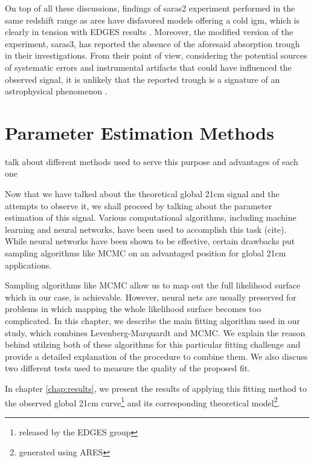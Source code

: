 \documentclass[12pt, TexShade, letterpaper]{report}
\begin{document}
 On top of all these discussions, findings of \gls{saras}2 experiment performed in the same redshift range as \gls{ares} have disfavored models offering a cold \gls{igm}, which is clearly in tension with EDGES results \cite{saras_2_constrains, saras_2_results}. Moreover, the modified version of the experiment, \gls{saras}3, has reported the absence of the aforesaid absorption trough in their investigations. From their point of view, considering the potential sources of systematic errors and instrumental artifacts that could have influenced the observed signal, it is unlikely that the reported trough is a signature of an astrophysical phenomenon \cite{saras_3_results, saras_curse_edges}.\par
\chapter{Parameter Estimation Methods}
\label{chap:method}
talk about different methods used to serve this purpose and advantages of each one\par
Now that we have talked about the theoretical global 21cm signal and the attempts to observe it, we shall proceed by talking about the parameter estimation of this signal. Various computational algorithms, including machine learning and neural networks, have been used to accomplish this task (cite). While neural networks have been shown to be effective, certain drawbacks  put sampling algorithms like MCMC on an advantaged position for global 21cm applications.\par
Sampling algorithms like MCMC allow us to map out the full likelihood surface which in our case, is achievable. However, neural nets are usually preserved for problems in which mapping the whole likelihood surface  becomes too complicated.
In this chapter, we describe the main fitting algorithm used in our study, which combines Levenberg-Marquardt and MCMC. We explain the reason behind utilzing both of these algorithms for this particular fitting challenge and provide a detailed explanation of the procedure to combine them. We also discuss two different tests used to measure the quality of the proposed fit.\par
In chapter \ref{chap:results}, we present the results of applying this fitting method to the observed global 21cm curve\footnote{released by the EDGES group} and its corresponding theoretical model\footnote{generated using ARES}.
\end{document}
